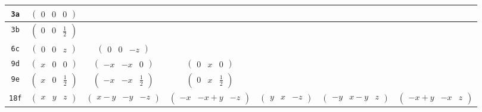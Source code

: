 \documentclass[fleqn,9pt,landscape]{jsarticle}
\begin{document}
\begin{center}
\begin{longtable}{ccccccc}
{\tt 3a} & $ \begin{pmatrix} 0 & 0 & 0 \end{pmatrix} $ & $  $ & $  $ & $  $ & $  $ & $  $ \\ \hline
{\tt 3b} & $ \begin{pmatrix} 0 & 0 & \frac{1}{2} \end{pmatrix} $ & $  $ & $  $ & $  $ & $  $ & $  $ \\ \hline
{\tt 6c} & $ \begin{pmatrix} 0 & 0 & z \end{pmatrix} $ & $ \begin{pmatrix} 0 & 0 & - z \end{pmatrix} $ & $  $ & $  $ & $  $ & $  $ \\ \hline
{\tt 9d} & $ \begin{pmatrix} x & 0 & 0 \end{pmatrix} $ & $ \begin{pmatrix} - x & - x & 0 \end{pmatrix} $ & $ \begin{pmatrix} 0 & x & 0 \end{pmatrix} $ & $  $ & $  $ & $  $ \\ \hline
{\tt 9e} & $ \begin{pmatrix} x & 0 & \frac{1}{2} \end{pmatrix} $ & $ \begin{pmatrix} - x & - x & \frac{1}{2} \end{pmatrix} $ & $ \begin{pmatrix} 0 & x & \frac{1}{2} \end{pmatrix} $ & $  $ & $  $ & $  $ \\ \hline
{\tt 18f} & $ \begin{pmatrix} x & y & z \end{pmatrix} $ & $ \begin{pmatrix} x - y & - y & - z \end{pmatrix} $ & $ \begin{pmatrix} - x & - x + y & - z \end{pmatrix} $ & $ \begin{pmatrix} y & x & - z \end{pmatrix} $ & $ \begin{pmatrix} - y & x - y & z \end{pmatrix} $ & $ \begin{pmatrix} - x + y & - x & z \end{pmatrix} $ \\
\end{longtable}
\end{center}
\end{document}
